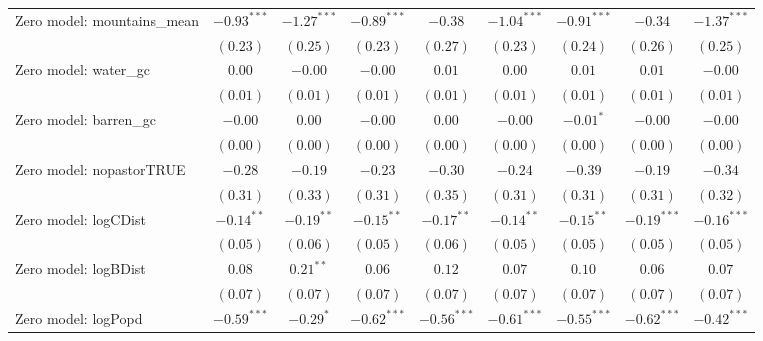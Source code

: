 \begin{sidewaystable}
\begin{center}
{\begin{tabular}{l c c c c c c c c}
Zero model: mountains\_mean    & $-0.93^{***}$ & $-1.27^{***}$ & $-0.89^{***}$ & $-0.38$       & $-1.04^{***}$  & $-0.91^{***}$ & $-0.34$        & $-1.37^{***}$  \\
                               & $(0.23)$      & $(0.25)$      & $(0.23)$      & $(0.27)$      & $(0.23)$       & $(0.24)$      & $(0.26)$       & $(0.25)$       \\
Zero model: water\_gc          & $0.00$        & $-0.00$       & $-0.00$       & $0.01$        & $0.00$         & $0.01$        & $0.01$         & $-0.00$        \\
                               & $(0.01)$      & $(0.01)$      & $(0.01)$      & $(0.01)$      & $(0.01)$       & $(0.01)$      & $(0.01)$       & $(0.01)$       \\
Zero model: barren\_gc         & $-0.00$       & $0.00$        & $-0.00$       & $0.00$        & $-0.00$        & $-0.01^{*}$   & $-0.00$        & $-0.00$        \\
                               & $(0.00)$      & $(0.00)$      & $(0.00)$      & $(0.00)$      & $(0.00)$       & $(0.00)$      & $(0.00)$       & $(0.00)$       \\
Zero model: nopastorTRUE       & $-0.28$       & $-0.19$       & $-0.23$       & $-0.30$       & $-0.24$        & $-0.39$       & $-0.19$        & $-0.34$        \\
                               & $(0.31)$      & $(0.33)$      & $(0.31)$      & $(0.35)$      & $(0.31)$       & $(0.31)$      & $(0.31)$       & $(0.32)$       \\
Zero model: logCDist           & $-0.14^{**}$  & $-0.19^{**}$  & $-0.15^{**}$  & $-0.17^{**}$  & $-0.14^{**}$   & $-0.15^{**}$  & $-0.19^{***}$  & $-0.16^{***}$  \\
                               & $(0.05)$      & $(0.06)$      & $(0.05)$      & $(0.06)$      & $(0.05)$       & $(0.05)$      & $(0.05)$       & $(0.05)$       \\
Zero model: logBDist           & $0.08$        & $0.21^{**}$   & $0.06$        & $0.12$        & $0.07$         & $0.10$        & $0.06$         & $0.07$         \\
                               & $(0.07)$      & $(0.07)$      & $(0.07)$      & $(0.07)$      & $(0.07)$       & $(0.07)$      & $(0.07)$       & $(0.07)$       \\
Zero model: logPopd            & $-0.59^{***}$ & $-0.29^{*}$   & $-0.62^{***}$ & $-0.56^{***}$ & $-0.61^{***}$  & $-0.55^{***}$ & $-0.62^{***}$  & $-0.42^{***}$  \\

\end{tabular}}
\end{center}
\end{sidewaystable}
